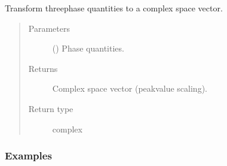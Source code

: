 \documentclass[letterpaper,10pt,english]{sphinxmanual}
\begin{document}
\begin{fulllineitems}
\label{\detokenize{helpers:helpers.abc2complex}}
\pysigstartsignatures
{}
\pysigstopsignatures
\sphinxAtStartPar
Transform three\sphinxhyphen{}phase quantities to a complex space vector.
\begin{quote}\begin{description}
\item[{Parameters}] \leavevmode
\sphinxAtStartPar
{} (\sphinxstyleliteralemphasis{\sphinxupquote{, }}\sphinxstyleliteralemphasis{\sphinxupquote{ (}}\sphinxstyleliteralemphasis{\sphinxupquote{,}}\sphinxstyleliteralemphasis{\sphinxupquote{)}}) \textendash{} Phase quantities.

\item[{Returns}] \leavevmode
\sphinxAtStartPar
Complex space vector (peak\sphinxhyphen{}value scaling).

\item[{Return type}] \leavevmode
\sphinxAtStartPar
complex

\end{description}\end{quote}
\subsubsection*{Examples}

\begin{sphinxVerbatim}[commandchars=\\\{\}]
  \PYG{p}{[}  \PYG{p}{]}
\end{sphinxVerbatim}

\end{fulllineitems}

\end{document}

